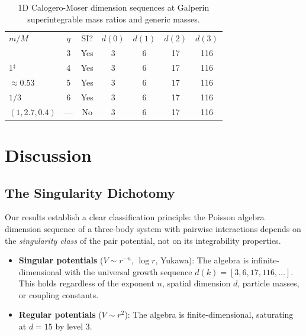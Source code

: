 \documentclass[aps,prl,twocolumn,superscriptaddress,showpacs]{revtex4-2}
\begin{document}
\begin{table}[h]
\caption{1D Calogero-Moser dimension sequences at
Galperin superintegrable mass ratios and generic masses.}
\label{tab:masses}
\begin{ruledtabular}
\begin{tabular}{lcccccc}
$m/M$ & $q$ & SI? & $d(0)$ & $d(1)$ & $d(2)$ & $d(3)$ \\
\colrule
3       & 3 & Yes & 3 & 6 & 17 & 116 \\
1$^\ddagger$  & 4 & Yes & 3 & 6 & 17 & 116 \\
$\approx 0.53$ & 5 & Yes & 3 & 6 & 17 & 116 \\
$1/3$   & 6 & Yes & 3 & 6 & 17 & 116 \\
$(1, 2.7, 0.4)$ & --- & No & 3 & 6 & 17 & 116 \\
\end{tabular}
\end{ruledtabular}
\end{table}


\section{Discussion}
\label{sec:discussion}

\subsection{The Singularity Dichotomy}

Our results establish a clear classification principle: the Poisson
algebra dimension sequence of a three-body system with pairwise
interactions depends on the \emph{singularity class} of the pair
potential, not on its integrability properties.

\begin{itemize}
\item \textbf{Singular potentials} ($V \sim r^{-n}$, $\log r$,
  Yukawa): The algebra is infinite-dimensional with the universal
  growth sequence $d(k) = [3, 6, 17, 116, \ldots]$.  This holds
  regardless of the exponent $n$, spatial dimension $d$, particle
  masses, or coupling constants.

\item \textbf{Regular potentials} ($V \sim r^2$): The algebra is
  finite-dimensional, saturating at $d = 15$ by level 3.
\end{itemize}
\end{document}
